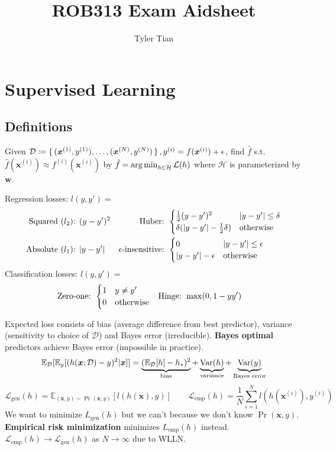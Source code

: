 \documentclass[twocolumn, 8pt]{extarticle}
\title{ROB313 Exam Aidsheet}
\author{Tyler Tian}
\begin{document}
\setlength{\abovedisplayskip}{3pt}
\setlength{\belowdisplayskip}{3pt}
\setlength{\parindent}{0pt}

\section{Supervised Learning} %

\subsection{Definitions} %

Given \(\mathcal D \coloneq \set{(\bm x^{(1)}, y^{(1)}), \dots, (\bm x^{(N)}, y^{(N)})}, y^{(i)} = f(\bm x^{(i)}) + \epsilon\),
find \(\hat f\) s.t. \(\hat f(\bm x^{(i)}) \approx f^{(i)}(\bm x^{(i)})\) by \(\hat f = \operatorname*{arg\,min} _{h \in \mathcal H} \mathcal L(h)\)
where \(\mathcal H\) is parameterized by \(\bm w\).

Regression losses: \(l(y, y') =\)
\begin{align*}
    \text{Squared ($l_2$): }& (y - y')^2 & \text{Huber: }& \begin{cases} {\frac{1}{2}(y - y')^2} & {\lvert y - y'\rvert \leq \delta} \\ {\textstyle\delta(\lvert y - y'\rvert - \frac{1}{2}\delta)} & {\text{otherwise}} \end{cases} \\
    \text{Absolute ($l_1$): }& \lvert y - y'\rvert&
    \epsilon\text{-insensitive: }& \begin{cases} {0} & {\lvert y - y'\rvert \leq \epsilon} \\ {\lvert y - y'\rvert - \epsilon} & {\text{otherwise}} \end{cases}
\end{align*}
Classification losses: \(l(y, y') =\)
\begin{align*}
    \text{Zero-one: } & \begin{cases} {1} & {y \neq y'} \\ {0} & {\text{otherwise}} \end{cases} & \text{Hinge: } & \max(0, 1 - yy')
\end{align*}

Expected loss consists of bias (average difference from best predictor), variance (sensitivity to choice of \(\mathcal D\))
and Bayes error (irreducible). \textbf{Bayes optimal} predictors achieve Bayes error (impossible in practice).
\[
    \mathbb E_{\mathcal D}[\mathbb E_y[(h(\bm x; \mathcal D) - y)^2 | \bm x]] = \underbrace{(\mathbb E_{\mathcal D}[h] - h_*)^2}_\text{bias} + \underbrace{\operatorname{Var}(h)}_\text{variance} + \underbrace{\operatorname{Var}(y)}_\text{Bayes error}
\]
\[
    \mathcal L_\text{gen}(h) = \mathbb E_{(\bm x, y) \sim \Pr(\bm x, y)}[l(h(\bm x), y)] \qquad \mathcal L_\text{emp}(h) = \frac{1}{N}\sum _{i = 1}^N l(h(\bm x^{(i)}), y^{(i)})
\]
We want to minimize \(L_\text{gen}(h)\) but we can't because we don't know \(\Pr(\bm x, y)\).
\textbf{Empirical risk minimization} minimizes \(L_\text{emp}(h)\) instead.
\(\mathcal L_\text{emp}(h) \to \mathcal L_\text{gen}(h)\) as \(N \to \infty\) due to WLLN.
\end{document}
